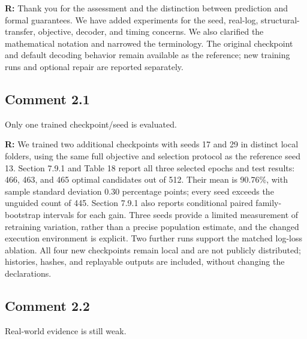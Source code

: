 \documentclass[11pt,a4paper]{article}
\newenvironment{reviewercomment}{%
  \begin{list}{}{\setlength{\leftmargin}{1.5em}%
    \setlength{\rightmargin}{0pt}\setlength{\topsep}{0.5em}}%
  \item\relax\color{reviewerred}\ignorespaces
}{\end{list}}
\begin{document}
{\color{black}\textbf{R:} Thank you for the assessment and the distinction between prediction and formal guarantees. We have added experiments for the seed, real-log, structural-transfer, objective, decoder, and timing concerns. We also clarified the mathematical notation and narrowed the terminology. The original checkpoint and default decoding behavior remain available as the reference; new training runs and optional repair are reported separately.\par}

\subsection*{Comment 2.1}

\begin{reviewercomment}Only one trained checkpoint/seed is evaluated.\end{reviewercomment}

{\color{black}\textbf{R:} We trained two additional checkpoints with seeds 17 and 29 in distinct local folders, using the same full objective and selection protocol as the reference seed 13. Section 7.9.1 and Table 18 report all three selected epochs and test results: 466, 463, and 465 optimal candidates out of 512. Their mean is 90.76\%, with sample standard deviation 0.30 percentage points; every seed exceeds the unguided count of 445. Section 7.9.1 also reports conditional paired family-bootstrap intervals for each gain. Three seeds provide a limited measurement of retraining variation, rather than a precise population estimate, and the changed execution environment is explicit. Two further runs support the matched log-loss ablation. All four new checkpoints remain local and are not publicly distributed; histories, hashes, and replayable outputs are included, without changing the declarations.\par}

\subsection*{Comment 2.2}

\begin{reviewercomment}Real-world evidence is still weak.\end{reviewercomment}
\end{document}
